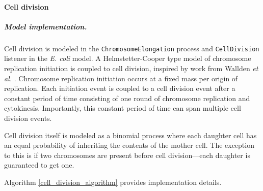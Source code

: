 \documentclass[12pt]{article}
\begin{document}
\baselineskip24pt

\paragraph{Cell division}

\subparagraph{Model implementation.} Cell division is modeled in the \texttt{ChromosomeElongation} process and \texttt{CellDivision} listener in the \emph{E. coli} model. A Helmstetter-Cooper type model of chromosome replication initiation is coupled to cell division, inspired by work from Wallden \emph{et al.} \cite{Wallden2016}. Chromosome replication initiation occurs at a fixed mass per origin of replication. Each initiation event is coupled to a cell division event after a constant period of time consisting of one round of chromosome replication and cytokinesis. Importantly, this constant period of time can span multiple cell division events.

Cell division itself is modeled as a binomial process where each daughter cell has an equal probability of inheriting the contents of the mother cell. The exception to this is if two chromosomes are present before cell division---each daughter is guaranteed to get one.

Algorithm \ref{cell_division_algorithm} provides implementation details.\
\end{document}
